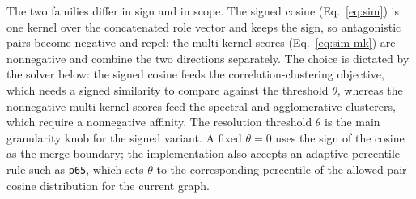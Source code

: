 \documentclass[../main.tex]{subfiles}
\begin{document}
The two families differ in sign and in scope. The signed cosine
(Eq.~\eqref{eq:sim}) is one kernel over the concatenated role vector and keeps the
sign, so antagonistic pairs become negative and repel; the multi-kernel scores
(Eq.~\eqref{eq:sim-mk}) are nonnegative and combine the two directions separately.
The choice is dictated by the solver below: the signed cosine feeds the
correlation-clustering objective, which needs a signed similarity to compare against
the threshold $\theta$, whereas the nonnegative multi-kernel scores feed the spectral
and agglomerative clusterers, which require a nonnegative affinity. The resolution
threshold $\theta$ is the main granularity knob for the signed variant. A fixed
$\theta = 0$ uses the sign of the cosine as the merge boundary; the implementation
also accepts an adaptive percentile rule such as \texttt{p65}, which sets $\theta$
to the corresponding percentile of the allowed-pair cosine distribution for the
current graph.
\end{document}
